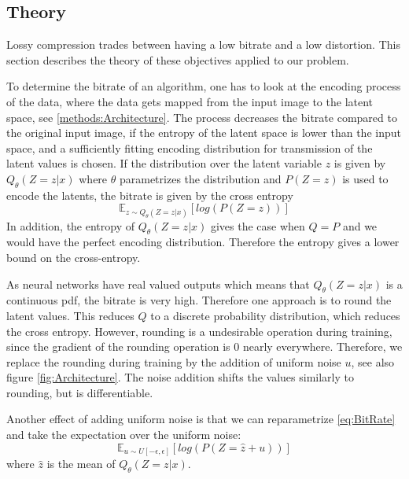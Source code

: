 \subsection{Theory}
    Lossy compression trades between having a low bitrate and a low distortion.
    This section describes the theory of these objectives applied to our
    problem.\newline

    To determine the bitrate of an algorithm, one has to look at the encoding
    process of the data, where the data gets mapped from the input image to the
    latent space, see \ref{methods:Architecture}. The process decreases the
    bitrate compared to the original input image, if the entropy of the latent
    space is lower than the input space, and a sufficiently fitting encoding
    distribution for transmission of the latent values is chosen. If the
    distribution over the latent variable $z$ is given by $Q_\theta(Z=z \vert x)$ where
    $\theta$ parametrizes the distribution and $P(Z=z)$ is used to encode the
    latents, the bitrate is given by the cross entropy
    \begin{equation}\label{eq:BitRate}
        \mathbb{E}_{z \sim Q_\theta(Z=z \vert x)}[log(P(Z=z))]
    \end{equation}
    In addition, the entropy of $Q_\theta(Z=z \vert x)$ gives the case when
    $Q=P$ and we would have the perfect encoding distribution. Therefore the
    entropy gives a lower bound on the cross-entropy.

    As neural networks have real valued outputs which means that $Q_\theta(Z=z
    \vert x)$ is a continuous pdf, the bitrate is very high. Therefore one
    approach is to round the latent values. This reduces $Q$ to a discrete
    probability distribution, which reduces the cross entropy. However, rounding
    is a undesirable operation during training, since the gradient of the
    rounding operation is 0 nearly everywhere. Therefore, we replace the
    rounding during training by the addition of uniform noise $u$, see also
    figure \ref{fig:Architecture}. The noise addition shifts the values
    similarly to rounding, but is differentiable.

    Another effect of adding uniform noise is that we can reparametrize
    \ref{eq:BitRate} and take the expectation over the uniform noise:
    \begin{equation}
        \mathbb{E}_{u \sim U[-\epsilon, \epsilon]}[log(P(Z=\hat{z} + u))]
    \end{equation}
    where $\hat{z}$ is the mean of $Q_\theta(Z=z \vert x)$. \newline

